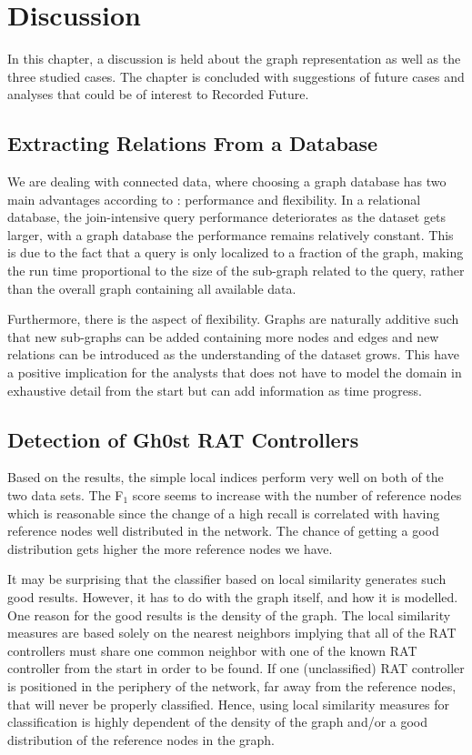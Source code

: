 \chapter{Discussion}
In this chapter, a discussion is held about the graph representation as well as the three studied cases. The chapter is concluded with suggestions of future cases and analyses that could be of interest to Recorded Future.

\section{Extracting Relations From a Database}
We are dealing with connected data, where choosing a graph database has two main advantages according to \citet{robinson2013}: performance and flexibility. In a relational database, the join-intensive query performance deteriorates as the dataset gets larger, with a graph database the performance remains relatively constant. This is due to the fact that a query is only localized to a fraction of the graph, making the run time proportional to the size of the sub-graph related to the query, rather than the overall graph containing all available data.

Furthermore, there is the aspect of flexibility. Graphs are naturally additive \cite{robinson2013} such that new sub-graphs can be added containing more nodes and edges and new relations can be introduced as the understanding of the dataset grows. This have a positive implication for the analysts that does not have to model the domain in exhaustive detail from the start but can add information as time progress.

\section{Detection of Gh0st RAT Controllers}
Based on the results, the simple local indices perform very well on both of the two data sets. The F$_1$ score seems to increase with the number of reference nodes which is reasonable since the change of a high recall is correlated with having reference nodes well distributed in the network. The chance of getting a good distribution gets higher the more reference nodes we have. 

It may be surprising that the classifier based on local similarity generates such good results. However, it has to do with the graph itself, and how it is modelled. One reason for the good results is the density of the graph. The local similarity measures are based solely on the nearest neighbors implying that all of the RAT controllers must share one common neighbor with one of the known RAT controller from the start in order to be found. If one (unclassified) RAT controller is positioned in the periphery of the network, far away from the reference nodes, that will never be properly classified. Hence, using local similarity measures for classification is highly dependent of the density of the graph and/or a good distribution of the reference nodes in the graph. 

